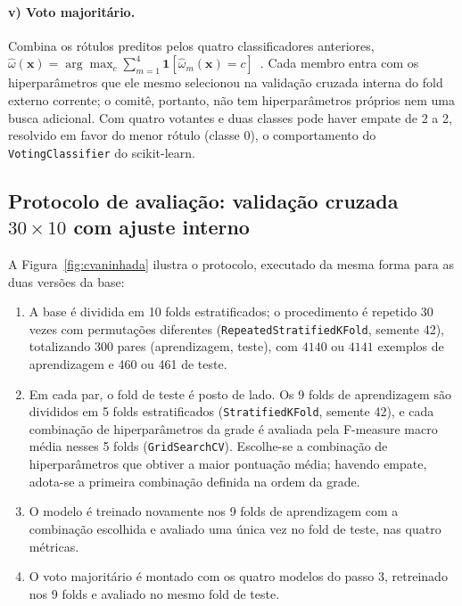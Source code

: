 \documentclass[11pt,a4paper]{article}
\begin{document}
\paragraph{v) Voto majoritário.} Combina os rótulos preditos pelos quatro classificadores anteriores,
$\hat\omega(\mathbf{x})=\arg\max_c\sum_{m=1}^{4}\mathbf{1}[\hat\omega_m(\mathbf{x})=c]$~\cite{kuncheva2014combining}.
Cada membro entra com os hiperparâmetros que ele mesmo selecionou na validação cruzada interna do fold externo
corrente; o comitê, portanto, não tem hiperparâmetros próprios nem uma busca adicional. Com quatro votantes e duas
classes pode haver empate de 2 a 2, resolvido em favor do menor rótulo (classe 0), o comportamento do
\texttt{VotingClassifier} do scikit-learn.

\subsection{Protocolo de avaliação: validação cruzada \texorpdfstring{$30\times10$}{30×10} com ajuste interno}\label{sec:protocolo}

A Figura~\ref{fig:cvaninhada} ilustra o protocolo, executado da mesma forma para as duas versões da base:

\begin{enumerate}
\item A base é dividida em 10 folds estratificados; o procedimento é repetido 30 vezes com permutações diferentes (\texttt{RepeatedStratifiedKFold}, 
  semente 42), totalizando 300 pares (aprendizagem, teste), com $\num{4140}$ ou $\num{4141}$ exemplos de aprendizagem e 460 ou 461 de teste.
\item Em cada par, o fold de teste é posto de lado. Os 9 folds de aprendizagem são divididos em 5 folds estratificados (\texttt{StratifiedKFold}, 
  semente 42), e cada combinação de hiperparâmetros da grade é avaliada pela F-measure macro média nesses 5 folds (\texttt{GridSearchCV}). Escolhe-se a 
  combinação de hiperparâmetros que obtiver a maior pontuação média; havendo empate, adota-se a primeira combinação definida na ordem da grade.
\item O modelo é treinado novamente nos 9 folds de aprendizagem com a combinação escolhida e avaliado uma única vez no fold de teste, nas quatro métricas.
\item O voto majoritário é montado com os quatro modelos do passo 3, retreinado nos 9 folds e avaliado no mesmo fold de teste.
\end{enumerate}
\end{document}
